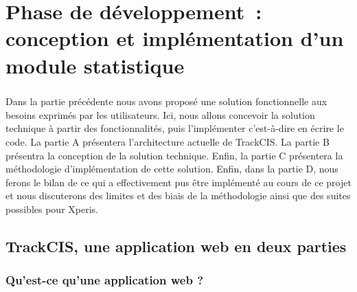\chapter{Phase de développement~: conception et implémentation d'un module
statistique}
	\paragraph{}
	Dans la partie précédente nous avons proposé une solution fonctionnelle aux
	besoins exprimés par les utilisateurs. Ici, nous allons concevoir la solution
	technique à partir des fonctionnalités, puis l'implémenter c'est-à-dire en
	écrire le code.
	La partie A présentera l'architecture actuelle de TrackCIS. La partie B
	présentra la conception de la solution technique. Enfin, la partie C présentera
	la méthodologie d'implémentation de cette solution. Enfin, dans la partie D, nous ferons le
	bilan de ce qui a effectivement pus être implémenté au cours de ce projet et
	nous discuterons des limites et des biais de la méthodologie ainsi que des
	suites possibles pour Xperis.
	
	\section{TrackCIS, une application web en deux parties}
		
		\subsection{Qu'est-ce qu'une application web ?}
